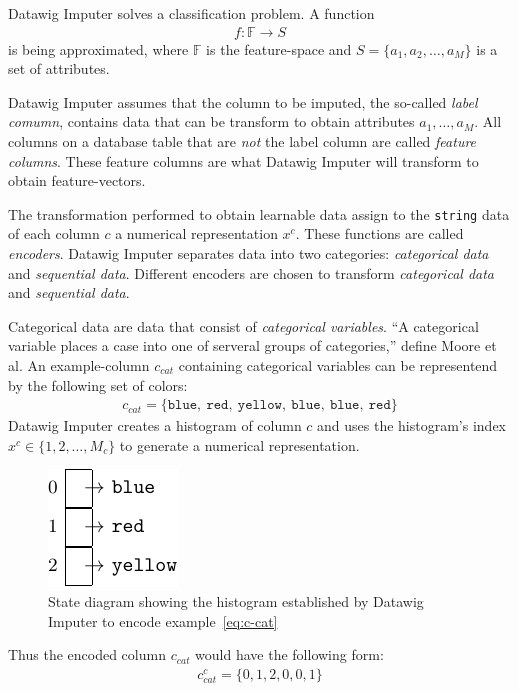 Datawig Imputer solves a classification problem.
A function
\begin{align}
    f: \mathbb{F} \rightarrow S
\end{align}
is being approximated, where \( \mathbb{F} \) is the feature-space and \( S = \{a_1, a_2, \dots, a_M \} \) is a set of attributes.

Datawig Imputer assumes that the column to be imputed, the so-called \emph{label comumn}, contains data that can be transform to obtain attributes \( a_1, \dots, a_M \).\cite[p.2]{BIE18}
All columns on a database table that are \emph{not} the label column are called \emph{feature columns}.
These feature columns are what Datawig Imputer will transform to obtain feature-vectors.

The transformation performed to obtain learnable data assign to the \texttt{string} data of each column \( c \) a numerical representation \( x^c \).
These functions are called \emph{encoders}.
Datawig Imputer separates data into two categories: \emph{categorical data} and \emph{sequential data}.
Different encoders are chosen to transform \emph{categorical data} and \emph{sequential data}.

Categorical data are data that consist of \emph{categorical variables}.
``A categorical variable places a case into one of serveral groups of categories,{''} define Moore et al.\cite[p.~4]{MOO11}
An example-column \( c_{cat} \) containing categorical variables can be representend by the following set of colors:
\begin{align}\label{eq:c-cat}
    c_{cat} = \{ \texttt{blue},~\texttt{red},~\texttt{yellow},~\texttt{blue},~\texttt{blue},~\texttt{red} \}
\end{align}
Datawig Imputer creates a histogram of column \( c \) and uses the histogram's index \( x^c \in \{1, 2, \dots, M_c \} \) to generate a numerical representation.
\begin{figure}[ht]
    \centering
    \includegraphics[width=.3\textwidth]{images/state_diagrams/color_histogram}
    \caption{State diagram showing the histogram established by Datawig Imputer to encode example~\ref{eq:c-cat}}
    \label{fig:state-diagram-color}
\end{figure}
Thus the encoded column \( c_{cat} \) would have the following form:
\begin{align}
    c_{cat}^{c} = \{ 0, 1, 2, 0, 0, 1\}
\end{align}

